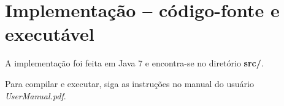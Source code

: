 \section{Implementação -- código-fonte e executável}

A implementação foi feita em Java 7 e encontra-se no diretório \textbf{src/}. \par
Para compilar e executar, siga as instruções no manual do usuário \emph{UserManual.pdf}.
